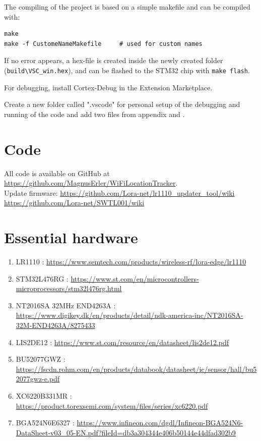 \begin{appendices}
The compiling of the project is based on a simple makefile and can be compiled with:
\begin{lstlisting}[style=bash]
make
make -f CustomeNameMakefile     # used for custom names
\end{lstlisting}
If no error appears, a hex-file is created inside the newly created folder (\lstinline[style=bash]{build\VSC_win.hex}), and can be flashed to the STM32 chip with \lstinline[style=bash]{make flash}.

For debugging, install Cortex-Debug  in the Extension Marketplace.

Create a new folder called ".vscode" for personal setup of the debugging and running of the code and add two files from appendix  and .

\section{Code} \label{app:code}
All code is available on GitHub at \url{https://github.com/MagnusErler/WiFiLocationTracker}.\\
Update firmware: \url{https://github.com/Lora-net/lr1110_updater_tool/wiki}\\
\url{https://github.com/Lora-net/SWTL001/wiki}

\section{Essential hardware} \label{app:hardware}
\begin{enumerate}
    \item LR1110 : \url{https://www.semtech.com/products/wireless-rf/lora-edge/lr1110} \label{app:hardware:lr1110}
    \item STM32L476RG : \url{https://www.st.com/en/microcontrollers-microprocessors/stm32l476rg.html} \label{app:hardware:stm32l476rg}
    \item NT2016SA 32MHz END4263A : \url{https://www.digikey.dk/en/products/detail/ndk-america-inc/NT2016SA-32M-END4263A/8275433} \label{app:hardware:tcxo}
    \item LIS2DE12 : \url{https://www.st.com/resource/en/datasheet/lis2de12.pdf} \label{app:hardware:lis2de12}
    \item BU52077GWZ : \url{https://fscdn.rohm.com/en/products/databook/datasheet/ic/sensor/hall/bu52077gwz-e.pdf} \label{app:hardware:BU52077GWZ}
    \item XC6220B331MR : \url{https://product.torexsemi.com/system/files/series/xc6220.pdf} \label{app:hardware:XC6220}
    \item BGA524N6E6327 : \url{https://www.infineon.com/dgdl/Infineon-BGA524N6-DataSheet-v03_05-EN.pdf?fileId=db3a304344e406b50144e44dfad302b9} \label{app:hardware:bga524n6e6327}
\end{enumerate}


\end{appendices}
